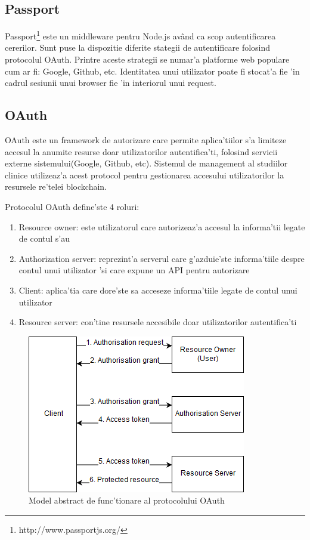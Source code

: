 \documentclass[12pt,a4paper,twoside]{report}
\begin{document}
\subsection{Passport}
Passport\footnote{http://www.passportjs.org/} este un middleware pentru Node.js av\^and ca scop autentificarea cererilor. Sunt puse la dispozitie diferite stategii de autentificare folosind protocolul OAuth. Printre aceste strategii se numar'a platforme web populare cum ar fi: Google, Github, etc. Identitatea unui utilizator poate fi stocat'a fie 'in cadrul sesiunii unui browser fie 'in interiorul unui request.
\subsection{OAuth}
OAuth este un framework de autorizare care permite aplica'tiilor s'a limiteze accesul la anumite resurse doar utilizatorilor autentifica'ti, folosind servicii externe sistemului(Google, Github, etc). Sistemul de management al studiilor clinice utilizeaz'a acest protocol pentru gestionarea accesului utilizatorilor la resursele re'telei blockchain.

Protocolul OAuth define'ste 4 roluri:
\begin{enumerate}
    \item Resource owner: este utilizatorul care autorizeaz'a accesul la informa'tii legate de contul s'au
    \item Authorization  server: reprezint'a serverul care g'azduie'ste informa'tiile despre contul unui utilizator 'si care expune un API pentru autorizare
    \item Client: aplica'tia care dore'ste sa acceseze informa'tiile legate de contul unui utilizator
    \item Resource server: con'tine resursele accesibile doar utilizatorilor autentifica'ti
\end{enumerate}

	\begin{figure}[H]
		\begin{center}
			\includegraphics[scale=0.50]{img/oauth.png}
			\caption{Model abstract de func'tionare al protocolului OAuth\cite{oauth}}
  			\label{fig:oauth}
  		\end{center}
  		\end{figure}
  		
\end{document}
